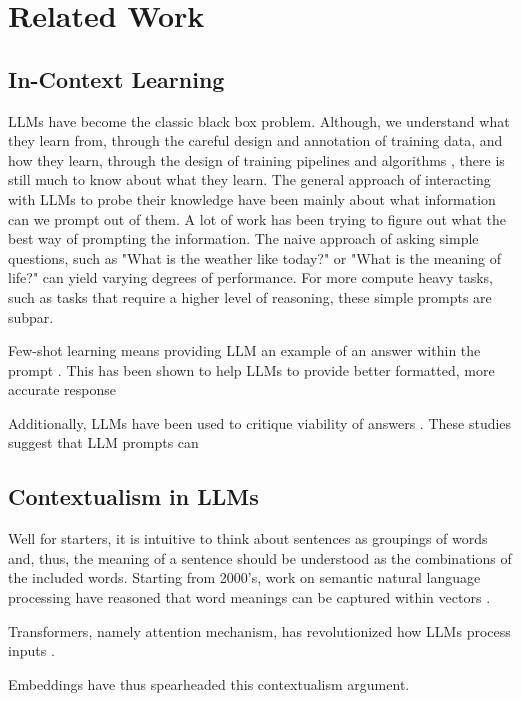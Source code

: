 \documentclass{brandeis-thesis3.2}
\theoremstyle{plain}
\theoremstyle{definition}
\theoremstyle{remark}
\numberwithin{equation}{section}
\renewcommand\cite{\citep}
\begin{document}
\chapter{Related Work}
\section{In-Context Learning}
LLMs have become the classic black box problem. Although, we understand what they learn from, through the careful design and annotation of training data, and how they learn, through the design of training pipelines and algorithms \cite{kingma_adam_2017, deepseek-ai_deepseek-r1_2025}, there is still much to know about what they learn. The general approach of interacting with LLMs to probe their knowledge have been mainly about what information can we prompt out of them. A lot of work has been trying to figure out what the best way of prompting the information. The naive approach of asking simple questions, such as "What is the weather like today?" or "What is the meaning of life?" can yield varying degrees of performance. For more compute heavy tasks, such as tasks that require a higher level of reasoning, these simple prompts are subpar.

Few-shot learning means providing LLM an example of an answer within the prompt \cite{brown_language_2020}. This has been shown to help LLMs to provide better formatted, more accurate response

Additionally, LLMs have been used to critique viability of answers \cite{stechly_gpt-4_2023, zheng_judging_2023}. These studies suggest that LLM prompts can 

\section{Contextualism in LLMs}
Well for starters, it is intuitive to think about sentences as groupings of words and, thus, the meaning of a sentence should be understood as the combinations of the included words. Starting from 2000's, work on semantic natural language processing have reasoned that word meanings can be captured within vectors \cite{bengio_neural_nodate}. 

Transformers, namely attention mechanism, has revolutionized how LLMs process inputs \cite{vaswani_attention_2023}. 

Embeddings have thus spearheaded this contextualism argument. 

\end{document}
